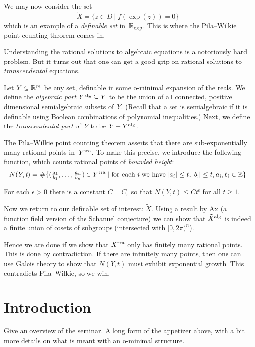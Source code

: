 \documentclass[10pt, a4paper]{amsart}
\begin{document}
We may now consider the set
\[ \tilde X = \{ z \in D \mid f(\exp(z)) = 0 \} \]
which is an example of a \emph{definable set} in~$\mathbb{R}_{\exp}$.
This is where the Pila--Wilkie point counting theorem comes in.

Understanding the rational solutions to algebraic equations is a notoriously hard problem.
But it turns out that one can get a good grip on rational solutions to \emph{transcendental} equations.

Let $Y \subseteq \mathbb{R}^m$ be any set, definable in some o-minimal expansion of the reals.
We define the \emph{algebraic part} $Y^{\mathrm{alg}} \subseteq Y$ to be
the union of all connected, positive dimensional semialgebraic subsets of~$Y$.
(Recall that a set is semialgebraic if it is definable using Boolean combinations of polynomial inequalities.)
Next, we define the \emph{transcendental part} of~$Y$ to be $Y - Y^{\mathrm{alg}}$.

The Pila--Wilkie point counting theorem asserts that there are sub-exponentially many rational points in~$Y^{\mathrm{tra}}$.
To make this precise, we introduce the following function,
which counts rational points of \emph{bounded height}:
\[
  N(Y,t) = \# \{ (\tfrac{a_1}{b_1}, \dots, \tfrac{a_n}{b_n}) \in Y^{\mathrm{tra}} \mid
  \text{for each $i$ we have }
  |a_i| \le t, |b_i| \le t, a_i, b_i \in \mathbb{Z} \}
\]

\begin{theorem}
  For each $\epsilon > 0$ there is a constant $C = C_\epsilon$
  so that $N(Y, t) \le Ct^\epsilon$ for all $t \ge 1$.
\end{theorem}

Now we return to our definable set of interest: $\tilde X$.
Using a result by Ax (a function field version of the Schanuel conjecture)
we can show that $\tilde X^{\mathrm{alg}}$ is indeed a finite union of cosets of subgroups
(intersected with $[0,2\pi)^n$).

Hence we are done if we show that $\tilde X^{\mathrm{tra}}$ only has finitely many rational points.
This is done by contradiction.
If there are infinitely many points,
then one can use Galois theory
to show that $N(Y, t)$ must exhibit exponential growth.
This contradicts Pila--Wilkie, so we win.

\section{Introduction}

Give an overview of the seminar.
A long form of the appetizer above,
with a bit more details on what is meant with an o-minimal structure.
\end{document}
